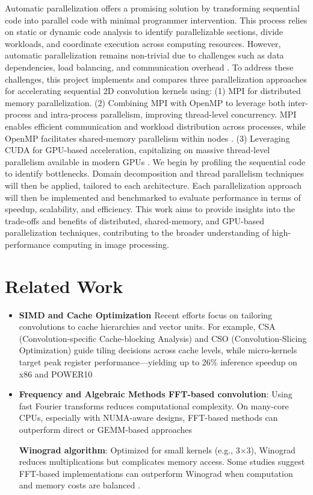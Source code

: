 \documentclass[conference, 10pt]{IEEEtran}
\begin{document}
Automatic parallelization offers a promising solution by transforming sequential code into parallel code with minimal programmer intervention. 
This process relies on static or dynamic code analysis to identify parallelizable sections,
divide workloads, and coordinate execution across computing resources. 
However, automatic parallelization remains non-trivial due to challenges such as data dependencies, 
load balancing, and communication overhead \cite{hager2021hpc}.
To address these challenges, this project implements and compares three parallelization approaches 
for accelerating sequential 2D convolution kernels using: 
(1) MPI for distributed memory parallelization\cite{toth2016convolution}. 
(2) Combining MPI with OpenMP to leverage both inter-process and intra-process parallelism, improving thread-level concurrency.
MPI enables efficient communication and workload distribution across processes, 
while OpenMP facilitates shared-memory parallelism within nodes \cite{farber2011openmp}. 
(3) Leveraging CUDA for GPU-based acceleration,
capitalizing on massive thread-level parallelism available in modern GPUs \cite{nvidia2021cuda}.
We begin by profiling the sequential code to identify bottlenecks. 
Domain decomposition and thread parallelism techniques will then be applied, tailored to each architecture. 
Each parallelization approach will then be implemented and benchmarked 
to evaluate performance in terms of speedup, scalability, and efficiency.
This work aims to provide insights into the trade-offs and benefits of distributed, shared-memory, and GPU-based parallelization techniques, 
contributing to the broader understanding of high-performance computing in image processing.



\section{Related Work}
\begin{itemize}
    \item \textbf{SIMD and Cache Optimization \cite{Ferrari2023}}
    Recent efforts focus on tailoring convolutions to cache hierarchies and vector units. For example, CSA (Convolution‑specific Cache-blocking Analysis) and CSO (Convolution‑Slicing Optimization) guide tiling decisions across cache levels, while micro‑kernels target peak register performance—yielding up to 26\% inference speedup on x86 and POWER10
    
    \item \textbf{Frequency and Algebraic Methods \cite{Huang2021}}
    \textbf{FFT-based convolution}: Using fast Fourier transforms reduces computational complexity. On many-core CPUs, especially with NUMA-aware designs, FFT-based methods can outperform direct or GEMM‑based approaches
    
    \textbf{Winograd algorithm}: Optimized for small kernels (e.g., 3×3), Winograd reduces multiplications but complicates memory access. Some studies suggest FFT-based implementations can outperform Winograd when computation and memory costs are balanced .
\end{itemize}
\end{document}
